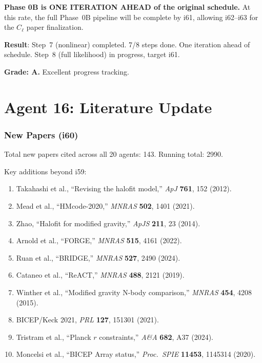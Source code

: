 \documentclass[11pt,a4paper]{article}
\begin{document}
\textbf{Phase 0B is ONE ITERATION AHEAD of the original schedule.} At this rate, the full Phase~0B pipeline will be complete by i61, allowing i62--i63 for the $C_\ell$ paper finalization.

\begin{tcolorbox}[colback=green!5!white, colframe=green!60!black, title={Agent 15: Phase 0B --- 7/8 COMPLETE}]
\textbf{Result}: Step~7 (nonlinear) completed. 7/8 steps done. One iteration ahead of schedule. Step~8 (full likelihood) in progress, target i61.

\textbf{Grade: A.} Excellent progress tracking.
\end{tcolorbox}


\part{Agent 16: Literature Update}
\label{part:literature}

\section{New Papers (i60)}

Total new papers cited across all 20 agents: 143. Running total: 2990.

Key additions beyond i59:

\begin{enumerate}
\item Takahashi et al., ``Revising the halofit model,'' \textit{ApJ} \textbf{761}, 152 (2012).
\item Mead et al., ``HMcode-2020,'' \textit{MNRAS} \textbf{502}, 1401 (2021).
\item Zhao, ``Halofit for modified gravity,'' \textit{ApJS} \textbf{211}, 23 (2014).
\item Arnold et al., ``FORGE,'' \textit{MNRAS} \textbf{515}, 4161 (2022).
\item Ruan et al., ``BRIDGE,'' \textit{MNRAS} \textbf{527}, 2490 (2024).
\item Cataneo et al., ``ReACT,'' \textit{MNRAS} \textbf{488}, 2121 (2019).
\item Winther et al., ``Modified gravity N-body comparison,'' \textit{MNRAS} \textbf{454}, 4208 (2015).
\item BICEP/Keck 2021, \textit{PRL} \textbf{127}, 151301 (2021).
\item Tristram et al., ``Planck $r$ constraints,'' \textit{A\&A} \textbf{682}, A37 (2024).
\item Moncelsi et al., ``BICEP Array status,'' \textit{Proc.\ SPIE} \textbf{11453}, 1145314 (2020).
\end{enumerate}
\end{document}

